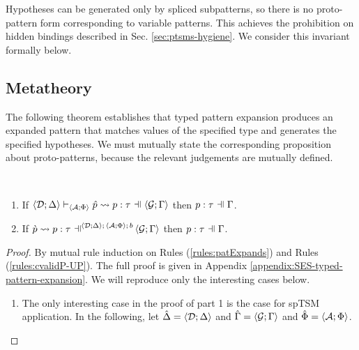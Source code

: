 {{{{Hypotheses can be generated only by spliced subpatterns, so there is no proto-pattern form corresponding to variable patterns. This achieves the prohibition on hidden bindings described in Sec. \ref{sec:ptsms-hygiene}. We consider this invariant formally below.

\subsection{Metatheory}
The following theorem establishes that typed pattern expansion produces an expanded pattern that matches values of the specified type and generates the specified hypotheses. We must mutually state the corresponding proposition about proto-patterns, because the relevant judgements are mutually defined.
\begingroup
\def\thetheorem{\ref{thm:typed-pattern-expansion}}
\begin{theorem} ~
\begin{enumerate}
  \item If $\pExpandsSP{\uDD{\uD}{\Delta}}{\uAS{\uA}{\Phi}}{\upv}{p}{\tau}{\uGG{\uG}{\pctx}}$ then $\patType{\pctx}{p}{\tau}$.
  \item If $\cvalidP{\uGG{\uG}{\pctx}}{\pscene{\uDD{\uD}{\Delta}}{\uAP{\uA}{\Phi}}{b}}{\cpv}{p}{\tau}$ then $\patType{\pctx}{p}{\tau}$.
\end{enumerate}
\end{theorem}
\begin{proof}
  By mutual rule induction on Rules (\ref{rules:patExpands}) and Rules (\ref{rules:cvalidP-UP}). The full proof is given in Appendix \ref{appendix:SES-typed-pattern-expansion}. We will reproduce only the interesting cases below.
  \begin{enumerate}
  \item The only interesting case in the proof of part 1 is the case for spTSM application. In the following, let $\hat{\Delta}=\langle \mathcal{D}; \Delta \rangle$ and $\hat\Gamma=\langle \mathcal{G}; \Gamma \rangle$ and $\hat\Phi=\langle \mathcal{A}; \Phi \rangle$.
  \begin{byCases}

\end{byCases}
\end{enumerate}
\end{proof}}}}}
